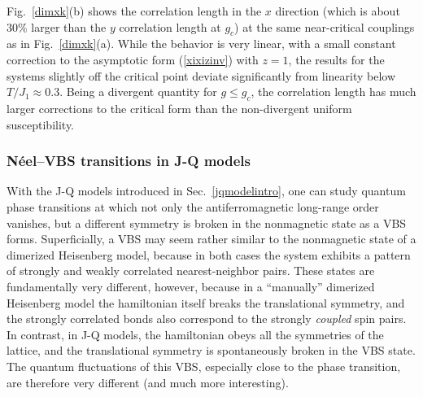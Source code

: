 \documentclass[draft,numberedheadings]{aipproc}
\begin{document}
Fig.~\ref{dimxk}(b) shows the correlation length in the $x$ direction (which is about $30\%$ larger than the $y$ correlation length at $g_c$) at the same
near-critical couplings as in Fig.~\ref{dimxk}(a). While the behavior is very linear, with a small constant correction to the asymptotic form (\ref{xixizinv}) 
with $z=1$, the results for the systems slightly off the critical point deviate significantly from linearity below $T/J_1\approx 0.3$. Being a divergent
quantity for $g\le g_c$, the correlation length has much larger corrections to the critical form than the non-divergent uniform susceptibility.

\subsubsection{N\'eel--VBS transitions in J-Q models}
\label{sec_jqresults}

With the J-Q models introduced in Sec.~\ref{jqmodelintro}, one can study quantum phase transitions at which not only the antiferromagnetic long-range 
order vanishes, but a different symmetry is broken in the nonmagnetic state as a VBS forms. Superficially, a VBS may seem rather similar to the 
nonmagnetic state of a dimerized Heisenberg model, because in both cases the system exhibits a pattern of strongly and weakly correlated nearest-neighbor 
pairs. These states are fundamentally very different, however, because in a ``manually'' dimerized Heisenberg model the hamiltonian itself breaks the 
translational symmetry, and the strongly correlated bonds also correspond to the strongly {\it coupled} spin pairs. In contrast, in J-Q models, the 
hamiltonian obeys all the symmetries of the lattice, and the translational symmetry is spontaneously broken in the VBS state. The quantum fluctuations 
of this VBS, especially close to the phase transition, are therefore very different (and much more interesting). 
\end{document}
